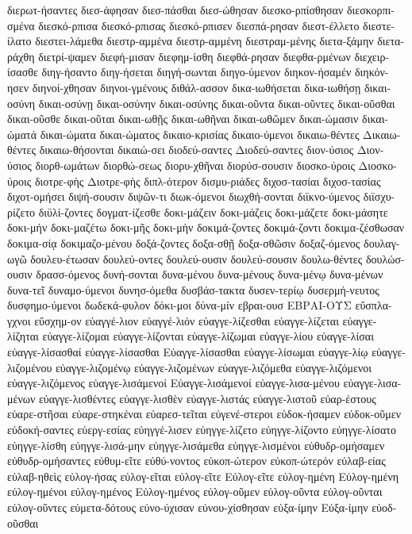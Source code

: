{διερωτ-ήσαντες
διεσ-άφησαν
διεσ-πάσθαι
διεσ-ώθησαν
διεσκο-ρπίσθησαν
διεσκορπι-σμένα
διεσκό-ρπισα
διεσκό-ρπισας
διεσκό-ρπισεν
διεσπά-ρησαν
διεστ-έλλετο
διεστε-ίλατο
διεστει-λάμεθα
διεστρ-αμμένα
διεστρ-αμμένη
διεστραμ-μένης
διετα-ξάμην
διετα-ράχθη
διετρί-ψαμεν
διεφή-μισαν
διεφημ-ίσθη
διεφθά-ρησαν
διεφθα-ρμένων
διεχειρ-ίσασθε
διηγ-ήσαντο
διηγ-ήσεται
διηγή-σωνται
διηγο-ύμενον
διηκον-ήσαμέν
διηκόν-ησεν
διηνοί-χθησαν
διηνοι-γμένους
διθάλ-ασσον
δικα-ιωθήσεται
δικα-ιωθήσῃ
δικαι-οσύνη
δικαι-οσύνῃ
δικαι-οσύνην
δικαι-οσύνης
δικαι-οῦντα
δικαι-οῦντες
δικαι-οῦσθαι
δικαι-οῦσθε
δικαι-οῦται
δικαι-ωθῇς
δικαι-ωθῆναι
δικαι-ωθῶμεν
δικαι-ώμασιν
δικαι-ώματά
δικαι-ώματα
δικαι-ώματος
δικαιο-κρισίας
δικαιο-ύμενοι
δικαιω-θέντες
Δικαιω-θέντες
δικαιω-θήσονται
δικαιώ-σει
διοδεύ-σαντες
Διοδεύ-σαντες
διον-ύσιος
Διον-ύσιος
διορθ-ωμάτων
διορθώ-σεως
διορυ-χθῆναι
διορύσ-σουσιν
διοσκο-ύροις
Διοσκο-ύροις
διοτρε-φὴς
Διοτρε-φὴς
διπλ-ότερον
δισμυ-ριάδες
διχοσ-τασίαι
διχοσ-τασίας
διχοτ-ομήσει
διψή-σουσιν
διψῶν-τι
διωκ-όμενοι
διωχθή-σονται
διϊκνο-ύμενος
διϊσχυ-ρίζετο
διϋλί-ζοντες
δογματ-ίζεσθε
δοκι-μάζειν
δοκι-μάζεις
δοκι-μάζετε
δοκι-μάσητε
δοκι-μήν
δοκι-μαζέτω
δοκι-μῆς
δοκι-μὴν
δοκιμά-ζοντες
δοκιμά-ζοντι
δοκιμα-ζέσθωσαν
δοκιμα-σίᾳ
δοκιμαζο-μένου
δοξά-ζοντες
δοξα-σθῇ
δοξα-σθῶσιν
δοξαζ-όμενος
δουλαγ-ωγῶ
δουλευ-έτωσαν
δουλεύ-οντες
δουλεύ-ουσιν
δουλεύ-σουσιν
δουλω-θέντες
δουλώσ-ουσιν
δρασσ-όμενος
δυνή-σονται
δυνα-μένου
δυνα-μένους
δυνα-μένῳ
δυνα-μένων
δυνα-τεῖ
δυναμο-ύμενοι
δυνησ-όμεθα
δυσβάσ-τακτα
δυσεν-τερίῳ
δυσερμή-νευτος
δυσφημο-ύμενοι
δωδεκά-φυλον
δόκι-μοι
δύνα-μίν
εβραι-ουσ
ΕΒΡΑΙ-ΟΥΣ
εὔσπλα-γχνοι
εὔσχημ-ον
εὐαγγέ-λιον
εὐαγγέ-λιόν
εὐαγγε-λίζεσθαι
εὐαγγε-λίζεται
εὐαγγε-λίζηται
εὐαγγε-λίζομαι
εὐαγγε-λίζονται
εὐαγγε-λίζωμαι
εὐαγγε-λίου
εὐαγγε-λίσαι
εὐαγγε-λίσασθαί
εὐαγγε-λίσασθαι
Εὐαγγε-λίσασθαι
εὐαγγε-λίσωμαι
εὐαγγε-λίῳ
εὐαγγε-λιζομένου
εὐαγγε-λιζομένῳ
εὐαγγε-λιζομένων
εὐαγγε-λιζόμεθα
εὐαγγε-λιζόμενοι
εὐαγγε-λιζόμενος
εὐαγγε-λισάμενοί
Εὐαγγε-λισάμενοί
εὐαγγε-λισα-μένου
εὐαγγε-λισα-μένων
εὐαγγε-λισθέντες
εὐαγγε-λισθὲν
εὐαγγε-λιστάς
εὐαγγε-λιστοῦ
εὐαρ-έστους
εὐαρε-στῆσαι
εὐαρε-στηκέναι
εὐαρεσ-τεῖται
εὐγενέ-στεροι
εὐδοκ-ήσαμεν
εὐδοκ-οῦμεν
εὐδοκή-σαντες
εὐεργ-εσίας
εὐηγγέ-λισεν
εὐηγγε-λίζετο
εὐηγγε-λίζοντο
εὐηγγε-λίσατο
εὐηγγε-λίσθη
εὐηγγε-λισά-μην
εὐηγγε-λισάμεθα
εὐηγγε-λισμένοι
εὐθυδρ-ομήσαμεν
εὐθυδρ-ομήσαντες
εὐθυμ-εῖτε
εὐθύ-νοντος
εὐκοπ-ώτερον
εὐκοπ-ώτερόν
εὐλαβ-είας
εὐλαβ-ηθεὶς
εὐλογ-ήσας
εὐλογ-εῖται
εὐλογ-εῖτε
Εὐλογ-εῖτε
εὐλογ-ημένη
Εὐλογ-ημένη
εὐλογ-ημένοι
εὐλογ-ημένος
Εὐλογ-ημένος
εὐλογ-οῦμεν
εὐλογ-οῦντα
εὐλογ-οῦνται
εὐλογ-οῦντες
εὐμετα-δότους
εὐνο-ύχισαν
εὐνου-χίσθησαν
εὐξα-ίμην
Εὐξα-ίμην
εὐοδ-οῦσθαι
}
